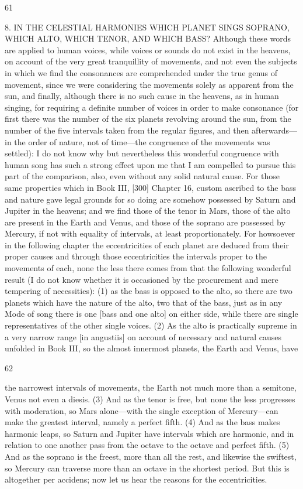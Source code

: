 \documentclass{article}
\begin{document}
61

8. IN THE CELESTIAL HARMONIES WHICH PLANET
SINGS SOPRANO, WHICH ALTO, WHICH TENOR,
AND WHICH BASS?
Although these words are applied to human voices, while voices or
sounds do not exist in the heavens, on account of the very great
tranquillity of movements, and not even the subjects in which we find
the consonances are comprehended under the true genus of movement,
since we were considering the movements solely as apparent from the
sun, and finally, although there is no such cause in the heavens, as in
human singing, for requiring a definite number of voices in order to
make consonance (for first there was the number of the six planets
revolving around the sun, from the number of the five intervals taken
from the regular figures, and then afterwards—in the order of nature, not
of time—the congruence of the movements was settled): I do not know
why but nevertheless this wonderful congruence with human song has
such a strong effect upon me that I am compelled to pursue this part of
the comparison, also, even without any solid natural cause. For those
same properties which in Book III, [300] Chapter 16, custom ascribed to
the bass and nature gave legal grounds for so doing are somehow
possessed by Saturn and Jupiter in the heavens; and we find those of the
tenor in Mars, those of the alto are present in the Earth and Venus, and
those of the soprano are possessed by Mercury, if not with equality of
intervals, at least proportionately. For howsoever in the following
chapter the eccentricities of each planet are deduced from their proper
causes and through those eccentricities the intervals proper to the
movements of each, none the less there comes from that the following
wonderful result (I do not know whether it is occasioned by the
procurement and mere tempering of necessities): (1) as the bass is
opposed to the alto, so there are two planets which have the nature of the
alto, two that of the bass, just as in any Mode of song there is one [bass
and one alto] on either side, while there are single representatives of the
other single voices. (2) As the alto is practically supreme in a very narrow
range [in angustiis] on account of necessary and natural causes unfolded
in Book III, so the almost innermost planets, the Earth and Venus, have


62

the narrowest intervals of movements, the Earth not much more than a
semitone, Venus not even a diesis. (3) And as the tenor is free, but none
the less progresses with moderation, so Mars alone—with the single
exception of Mercury—can make the greatest interval, namely a perfect
fifth. (4) And as the bass makes harmonic leaps, so Saturn and Jupiter
have intervals which are harmonic, and in relation to one another pass
from the octave to the octave and perfect fifth. (5) And as the soprano is
the freest, more than all the rest, and likewise the swiftest, so Mercury
can traverse more than an octave in the shortest period. But this is
altogether per accidens; now let us hear the reasons for the
eccentricities.
\end{document}
